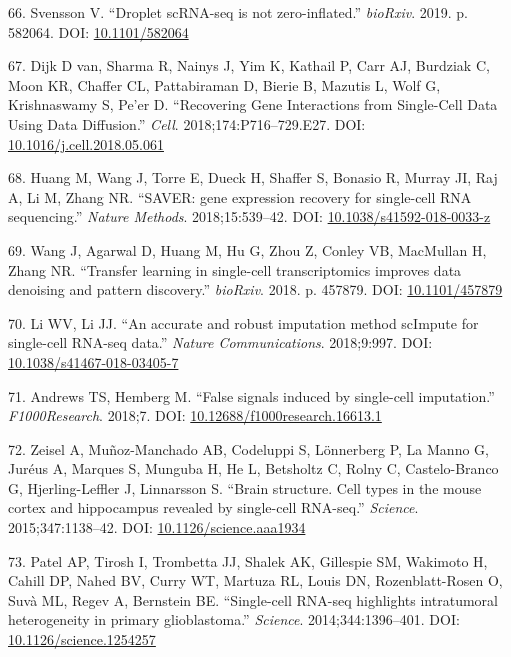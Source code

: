 \documentclass[11pt,a4paper,titlepage,twoside,openright]{style/unimelbthesis}
\theoremstyle{definition}
\theoremstyle{definition}
\theoremstyle{definition}
\theoremstyle{remark}
\begin{document}
\begin{mainmatter}
\leavevmode\hypertarget{ref-Svensson2019-el}{}%
66. Svensson V. ``Droplet scRNA-seq is not zero-inflated.'' \emph{bioRxiv}. 2019. p. 582064. DOI: \href{https://doi.org/10.1101/582064}{10.1101/582064}

\leavevmode\hypertarget{ref-Van_Dijk2018-dk}{}%
67. Dijk D van, Sharma R, Nainys J, Yim K, Kathail P, Carr AJ, Burdziak C, Moon KR, Chaffer CL, Pattabiraman D, Bierie B, Mazutis L, Wolf G, Krishnaswamy S, Pe'er D. ``Recovering Gene Interactions from Single-Cell Data Using Data Diffusion.'' \emph{Cell}. 2018;174:P716--729.E27. DOI: \href{https://doi.org/10.1016/j.cell.2018.05.061}{10.1016/j.cell.2018.05.061}

\leavevmode\hypertarget{ref-Huang2018-ef}{}%
68. Huang M, Wang J, Torre E, Dueck H, Shaffer S, Bonasio R, Murray JI, Raj A, Li M, Zhang NR. ``SAVER: gene expression recovery for single-cell RNA sequencing.'' \emph{Nature Methods}. 2018;15:539--42. DOI: \href{https://doi.org/10.1038/s41592-018-0033-z}{10.1038/s41592-018-0033-z}

\leavevmode\hypertarget{ref-Wang2018-av}{}%
69. Wang J, Agarwal D, Huang M, Hu G, Zhou Z, Conley VB, MacMullan H, Zhang NR. ``Transfer learning in single-cell transcriptomics improves data denoising and pattern discovery.'' \emph{bioRxiv}. 2018. p. 457879. DOI: \href{https://doi.org/10.1101/457879}{10.1101/457879}

\leavevmode\hypertarget{ref-Li2018-gx}{}%
70. Li WV, Li JJ. ``An accurate and robust imputation method scImpute for single-cell RNA-seq data.'' \emph{Nature Communications}. 2018;9:997. DOI: \href{https://doi.org/10.1038/s41467-018-03405-7}{10.1038/s41467-018-03405-7}

\leavevmode\hypertarget{ref-Andrews2018-li}{}%
71. Andrews TS, Hemberg M. ``False signals induced by single-cell imputation.'' \emph{F1000Research}. 2018;7. DOI: \href{https://doi.org/10.12688/f1000research.16613.1}{10.12688/f1000research.16613.1}

\leavevmode\hypertarget{ref-Zeisel2015-rd}{}%
72. Zeisel A, Muñoz-Manchado AB, Codeluppi S, Lönnerberg P, La Manno G, Juréus A, Marques S, Munguba H, He L, Betsholtz C, Rolny C, Castelo-Branco G, Hjerling-Leffler J, Linnarsson S. ``Brain structure. Cell types in the mouse cortex and hippocampus revealed by single-cell RNA-seq.'' \emph{Science}. 2015;347:1138--42. DOI: \href{https://doi.org/10.1126/science.aaa1934}{10.1126/science.aaa1934}

\leavevmode\hypertarget{ref-Patel2014-bl}{}%
73. Patel AP, Tirosh I, Trombetta JJ, Shalek AK, Gillespie SM, Wakimoto H, Cahill DP, Nahed BV, Curry WT, Martuza RL, Louis DN, Rozenblatt-Rosen O, Suvà ML, Regev A, Bernstein BE. ``Single-cell RNA-seq highlights intratumoral heterogeneity in primary glioblastoma.'' \emph{Science}. 2014;344:1396--401. DOI: \href{https://doi.org/10.1126/science.1254257}{10.1126/science.1254257}


\end{mainmatter}
\end{document}
